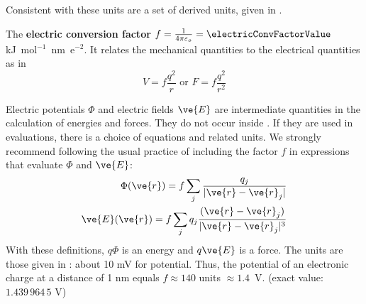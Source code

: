 Consistent with these units are a set of derived units, given in
.

The {\bf electric conversion factor} $f=\frac{1}{4 \pi
\varepsilon_o}=\electricConvFactorValue$ kJ~mol$^{-1}$~nm~e$^{-2}$. It relates
the mechanical quantities to the electrical quantities as in
\begin{equation}
 V = f \frac{q^2}{r} \mbox{\ \ or\ \ } F = f \frac{q^2}{r^2}
\end{equation}

Electric potentials $\Phi$ and electric fields $\ve{E}$ are
intermediate quantities in the calculation of energies and
forces. They do not occur inside {\gromacs}. If they are used in
evaluations, there is a choice of equations and related units. We
strongly recommend following the usual practice of including the factor
$f$ in expressions that evaluate $\Phi$ and $\ve{E}$:
\begin{eqnarray}
\Phi(\ve{r}) = f \sum_j \frac{q_j}{|\ve{r}-\ve{r}_j|} 	\\
\ve{E}(\ve{r}) = f \sum_j q_j \frac{(\ve{r}-\ve{r}_j)}{|\ve{r}-\ve{r}_j|^3}
\end{eqnarray}
With these definitions, $q\Phi$ is an energy and $q\ve{E}$ is a
force. The units are those given in :
about 10 mV for potential. Thus, the potential of an electronic charge
at a distance of 1 nm equals $f \approx 140$ units $\approx
1.4$~V. (exact value: $1.439\,964\,5$ V)


